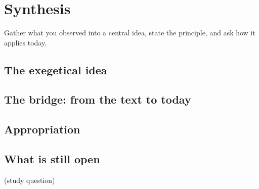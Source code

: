 \chapter{Synthesis}\label{cap:sintese}

\begin{objetivo}
Gather what you observed into a central idea, state the principle, and ask how it applies today.
\end{objetivo}

\section{The exegetical idea}

\section{The bridge: from the text to today}

\section{Appropriation}

\section{What is still open}

\begin{pergunta}
(study question)
\end{pergunta}
